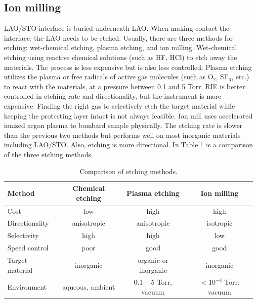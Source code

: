 \documentclass[pdflatex, sectionletters, 12pt, final, phd]{pittetd}    %
\begin{document}
\subsection{Ion milling}
\label{SEC:IonMilling}
LAO/STO interface is buried underneath LAO. When making contact the interface, the LAO needs to be etched. Usually, there are three methods for etching: wet-chemical etching, plasma etching, and ion milling. Wet-chemical etching using reactive chemical solutions (such as HF, HCl) to etch away the materials. The process is less expensive but is also less controlled. Plasma etching utilizes the plasma or free radicals of active gas molecules (such as O$_2$, SF$_6$, etc.) to react with the materials, at a pressure between 0.1 and 5 Torr. RIE is better controlled in etching rate and directionality, but the instrument is more expensive. Finding the right gas to selectively etch the target material while keeping the protecting layer intact is not always feasible. Ion mill uses accelerated ionized argon plasma to bombard sample physically. The etching rate is slower than the previous two methods but performs well on most inorganic materials including LAO/STO. Also, etching is more directional. In Table \ref{TAB:etching} is a comparison of the three etching methods.

\begin{table}
	\centering
	\begin{tabular}{l|ccc}
		\hline
		Method    &    Chemical etching    &    Plasma etching    & Ion milling \\ \hline
		Cost    &    low    & high    & high \\ 
		Directionality    &    anisotropic    &    anisotropic    &    isotropic \\ 
		Selectivity    &    high    &    high    &    low \\
		Speed control    &    poor    &    good    &    good \\
		Target material    &    inorganic    &    organic or inorganic    &    inorganic \\
		Environment    &    aqueous, ambient    &    0.1 -- 5 Torr, vacuum    &    $< 10^{-4}$ Torr, vacuum \\
		\hline  
	\end{tabular}
	\caption{Comparison of etching methods.}
	\label{TAB:etching}
	
\end{table}
\end{document}
